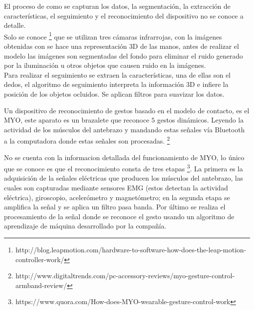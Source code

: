 El proceso de como se capturan los datos, la segmentación, la extracción de características, el seguimiento y el reconocimiento del dispositivo no se conoce a detalle.\\ 
Solo se conoce \footnote{http://blog.leapmotion.com/hardware-to-software-how-does-the-leap-motion-controller-work/} que se utilizan tres cámaras infrarrojas, con la imágenes obtenidas con se hace una representación 3D de las manos, antes de realizar el modelo las imágenes son segmentadas del fondo para eliminar el ruido generado por la iluminación u otros objetos que causen ruido en la imágenes. \\
Para realizar el seguimiento se extraen la características, una de ellas son el dedos, el algoritmo de seguimiento interpreta la información 3D e infiere la posición de los objetos ocluidos. Se aplican filtros para suavizar los datos. 


Un dispositivo de reconocimiento de gestos basado en el modelo de contacto, es el MYO, este aparato es un brazalete que reconoce $5$ gestos dinámicos. Leyendo la actividad de los músculos del antebrazo y mandando estas señales vía Bluetooth a la computadora donde estas señales son procesadas. \footnote{http://www.digitaltrends.com/pc-accessory-reviews/myo-gesture-control-armband-review/} 

No se cuenta con la informacion detallada del funcionamiento de MYO, lo único que se conoce es que el reconocimiento consta de tres etapas \footnote{https://www.quora.com/How-does-MYO-wearable-gesture-control-work}. La primera es la adquisición de la señales eléctricas que producen los músculos del antebrazo, las cuales son capturadas mediante sensores EMG (estos detectan la actividad eléctrica), giroscopio, acelerómetro y magnetómetro; en la segunda etapa se amplifica la señal y se aplica un filtro pasa banda. Por último se realiza el procesamiento de la señal donde se reconoce el gesto usando un algoritmo de aprendizaje de máquina desarrollado por la compañía.  

